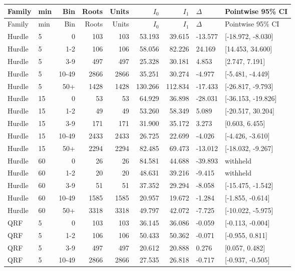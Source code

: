 \footnotesize\setlength{\tabcolsep}{3pt}\begin{longtable}{llrrrrrll}
\toprule Family & min & Bin & Roots & Units & $I_0$ & $I_1$ & $\Delta$ & Pointwise 95\% CI\\\midrule\endfirsthead
\toprule Family & min & Bin & Roots & Units & $I_0$ & $I_1$ & $\Delta$ & Pointwise 95\% CI\\\midrule\endhead
Hurdle & 5 & 0 & 103 & 103 & 53.193 & 39.615 & -13.577 & [-18.972, -8.030]\\
Hurdle & 5 & 1-2 & 106 & 106 & 58.056 & 82.226 & 24.169 & [14.453, 34.600]\\
Hurdle & 5 & 3-9 & 497 & 497 & 25.328 & 30.181 & 4.853 & [2.747, 7.191]\\
Hurdle & 5 & 10-49 & 2866 & 2866 & 35.251 & 30.274 & -4.977 & [-5.481, -4.449]\\
Hurdle & 5 & 50+ & 1428 & 1428 & 130.266 & 112.834 & -17.433 & [-26.817, -9.793]\\
Hurdle & 15 & 0 & 53 & 53 & 64.929 & 36.898 & -28.031 & [-36.153, -19.826]\\
Hurdle & 15 & 1-2 & 49 & 49 & 53.260 & 58.349 & 5.089 & [-20.517, 30.204]\\
Hurdle & 15 & 3-9 & 171 & 171 & 31.900 & 35.172 & 3.273 & [0.603, 6.455]\\
Hurdle & 15 & 10-49 & 2433 & 2433 & 26.725 & 22.699 & -4.026 & [-4.426, -3.610]\\
Hurdle & 15 & 50+ & 2294 & 2294 & 82.485 & 69.473 & -13.012 & [-18.032, -9.267]\\
Hurdle & 60 & 0 & 26 & 26 & 84.581 & 44.688 & -39.893 & withheld\\
Hurdle & 60 & 1-2 & 20 & 20 & 48.631 & 39.216 & -9.415 & withheld\\
Hurdle & 60 & 3-9 & 51 & 51 & 37.352 & 29.294 & -8.058 & [-15.475, -1.542]\\
Hurdle & 60 & 10-49 & 1585 & 1585 & 20.957 & 19.672 & -1.284 & [-1.855, -0.614]\\
Hurdle & 60 & 50+ & 3318 & 3318 & 49.797 & 42.072 & -7.725 & [-10.022, -5.975]\\
QRF & 5 & 0 & 103 & 103 & 36.145 & 36.086 & -0.059 & [-0.113, -0.004]\\
QRF & 5 & 1-2 & 106 & 106 & 50.433 & 50.362 & -0.071 & [-0.955, 0.811]\\
QRF & 5 & 3-9 & 497 & 497 & 20.612 & 20.888 & 0.276 & [0.057, 0.482]\\
QRF & 5 & 10-49 & 2866 & 2866 & 27.535 & 26.818 & -0.717 & [-0.937, -0.505]\\

\end{longtable}
